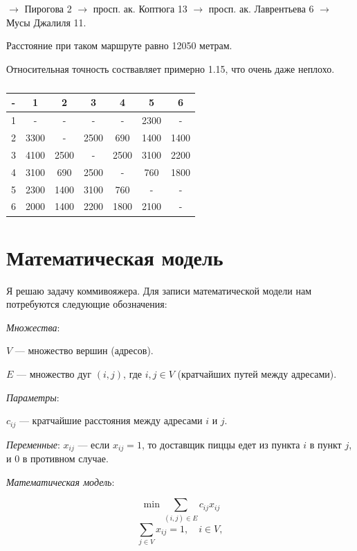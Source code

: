 \documentclass[]{article}
\begin{document}
$\rightarrow$ Пирогова 2 $\rightarrow$ просп. ак. Коптюга 13 $\rightarrow$ просп. ак. Лаврентьева 6 $\rightarrow$ Мусы Джалиля 11.
\par
Расстояние при таком маршруте равно 12050 метрам.

Относительная точность соствавляет примерно 1.15, что очень даже неплохо.


\begin{table}\caption{}\label{tab:2}
\centering
\begin{tabular}{|c|c|c|c|c|c|c|}
	\hline
- &    1  &   2  &   3  &   4  &   5  &  6  \\
\hline
1 &   -  &  -   &   -  &  -   & 2300 &  -   \\
\hline
2 & 3300 &  -   & 2500 &  690 & 1400 & 1400 \\
\hline
3 & 4100 & 2500 &  -   & 2500 & 3100 & 2200 \\
\hline
4	& 3100 &  690 & 2500 &  -   & 760  & 1800 \\
\hline
5	& 2300 & 1400 & 3100 &  760 &  -   &   -  \\
\hline
6 & 2000 & 1400 & 2200 & 1800 & 2100 &  -   \\
\hline

\hline
\end{tabular}
\end{table}

\section{Математическая модель}


Я решаю задачу коммивояжера.
Для записи математической модели нам потребуются следующие обозначения:
\par
\textit{Множества}:
\par\noindent
$V$ --- множество вершин (адресов).
\par\noindent
$E$ --- множество дуг $(i,j)$, где $i,j\in V$ (кратчайших путей между адресами).
\par
\textit{Параметры}:

$c_{ij}$ --- кратчайшие расстояния между адресами $i$ и $j$.
\par
\textit{Переменные}:
$x_{ij}$ --- если $x_{ij}=1$, то доставщик пиццы
едет из пункта $i$ в пункт $j$, и $0$ в противном случае.
\par
\textit{Математическая модель}:

\par\noindent
\begin{equation}
\min\sum_{(i,j)\in E}c_{ij}x_{ij}
\end{equation}
\begin{equation}\label{eq:2}
	\sum_{j\in V}
			x_{ij} = 1,\quad i\in V,
\end{equation}
\end{document}
